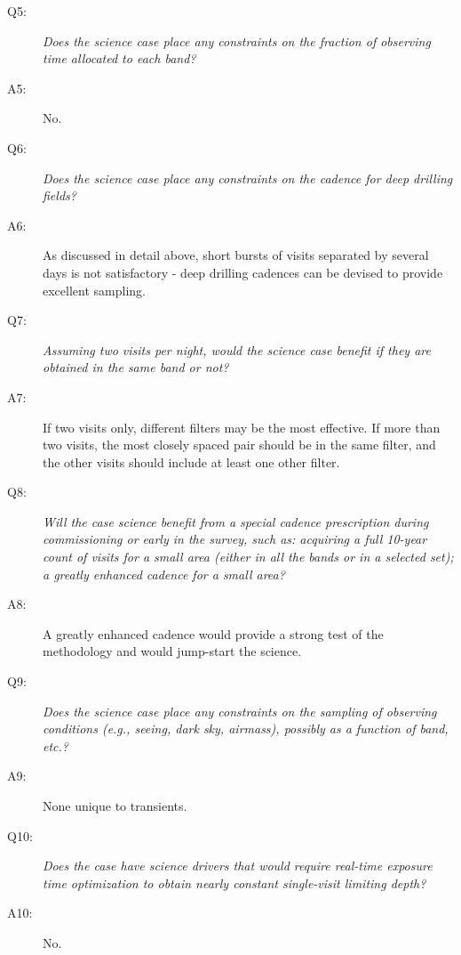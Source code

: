 \begin{description}
 \item[Q5:] {\it Does the science case place any constraints on the
 fraction of observing time allocated to each band?}

 \item[A5:] No.

 \item[Q6:] {\it Does the science case place any constraints on the
 cadence for deep drilling fields?}

 \item[A6:] As discussed in detail above, short bursts of visits separated by several days is not
satisfactory - deep drilling cadences can be devised to provide excellent sampling.

 \item[Q7:] {\it Assuming two visits per night, would the science case
 benefit if they are obtained in the same band or not?}

 \item[A7:] If two visits only, different filters may be the most effective. If more than two visits, the most closely spaced pair should be in the same filter, and the other visits should include at least one other filter.

 \item[Q8:] {\it Will the case science benefit from a special cadence
 prescription during commissioning or early in the survey, such as:
 acquiring a full 10-year count of visits for a small area (either in all
 the bands or in a  selected set); a greatly enhanced cadence for a small
 area?}

 \item[A8:] A greatly enhanced cadence would provide a strong test of the methodology and would jump-start the science.

 \item[Q9:] {\it Does the science case place any constraints on the
 sampling of observing conditions (e.g., seeing, dark sky, airmass),
 possibly as a function of band, etc.?}

 \item[A9:] None unique to transients.

 \item[Q10:] {\it Does the case have science drivers that would require
 real-time exposure time optimization to obtain nearly constant
 single-visit limiting depth?}

 \item[A10:] No.

 \end{description}
